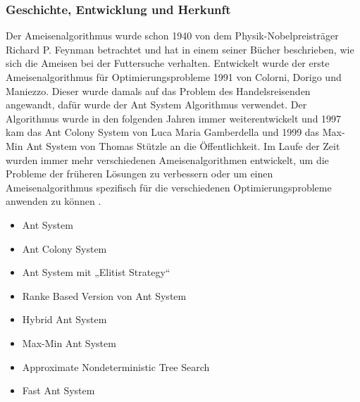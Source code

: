 \subsubsection{Geschichte, Entwicklung und Herkunft} \label{chap:Geschichte}
Der Ameisenalgorithmus wurde schon 1940 von dem Physik-Nobelpreisträger Richard P. Feynman betrachtet und hat in einem seiner Bücher beschrieben, wie sich die Ameisen bei der Futtersuche verhalten. Entwickelt wurde der erste Ameisenalgorithmus für Optimierungsprobleme 1991 von Colorni, Dorigo und Maniezzo. Dieser wurde damals auf das Problem des Handelsreisenden angewandt, dafür wurde der Ant System Algorithmus verwendet. Der Algorithmus wurde in den folgenden Jahren immer weiterentwickelt und 1997 kam das Ant Colony System von Luca Maria Gamberdella und 1999 das Max-Min Ant System von Thomas Stützle an die Öffentlichkeit. 
\newline
Im Laufe der Zeit wurden immer mehr verschiedenen Ameisenalgorithmen entwickelt, um die Probleme der früheren Lösungen zu verbessern oder um einen Ameisenalgorithmus spezifisch für die verschiedenen Optimierungsprobleme anwenden zu können \citep[S.5-11]{Blum2003}.
\begin{itemize}
  \item Ant System
  \item Ant Colony System
  \item Ant System mit „Elitist Strategy“
  \item Ranke Based Version von Ant System
  \item Hybrid Ant System
  \item Max-Min Ant System
  \item Approximate Nondeterministic Tree Search
  \item Fast Ant System
\end{itemize}


